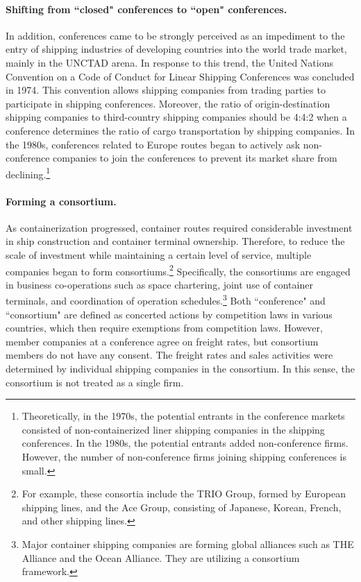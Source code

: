 \documentclass[11pt]{article}
\begin{document}
\paragraph{Shifting from ``closed" conferences to ``open" conferences.}
In addition, conferences came to be strongly perceived as an impediment to the entry of shipping industries of developing countries into the world trade market, mainly in the UNCTAD arena. In response to this trend, the United Nations Convention on a Code of Conduct for Linear Shipping Conferences was concluded in 1974. This convention allows shipping companies from trading parties to participate in shipping conferences. Moreover, the ratio of origin-destination shipping companies to third-country shipping companies should be 4:4:2 when a conference determines the ratio of cargo transportation by shipping companies. In the 1980s, conferences related to Europe routes began to actively ask non-conference companies to join the conferences to prevent its market share from declining.\footnote{Theoretically, in the 1970s, the potential entrants in the conference markets consisted of non-containerized liner shipping companies in the shipping conferences. In the 1980s, the potential entrants added non-conference firms. However, the number of non-conference firms joining shipping conferences is small.}

\paragraph{Forming a consortium.}
As containerization progressed, container routes required considerable investment in ship construction and container terminal ownership. Therefore, to reduce the scale of investment while maintaining a certain level of service, multiple companies began to form consortiums.\footnote{For example, these consortia include the TRIO Group, formed by European shipping lines, and the Ace Group, consisting of Japanese, Korean, French, and other shipping lines.} Specifically, the consortiums are engaged in business co-operations such as space chartering, joint use of container terminals, and coordination of operation schedules.\footnote{ Major container shipping companies are forming  global alliances such as THE Alliance and the Ocean Alliance. They are utilizing a consortium framework.} Both ``conference" and ``consortium" are defined as concerted actions by competition laws in various countries, which then require exemptions from competition laws. However, member companies at a conference agree on freight rates, but consortium members do not have any consent. The freight rates and sales activities were determined by individual shipping companies in the consortium. In this sense, the consortium is not treated as a single firm.
\end{document}

